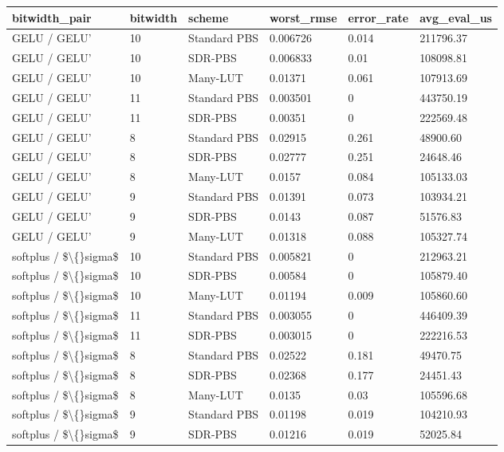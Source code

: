 \small
\setlength{\tabcolsep}{4pt}
\begin{tabular}{llllll}
\toprule
bitwidth\_pair & bitwidth & scheme & worst\_rmse & error\_rate & avg\_eval\_us \\
\midrule
GELU / GELU' & 10 & Standard PBS & 0.006726 & 0.014 & 211796.37 \\
GELU / GELU' & 10 & SDR-PBS & 0.006833 & 0.01 & 108098.81 \\
GELU / GELU' & 10 & Many-LUT & 0.01371 & 0.061 & 107913.69 \\
GELU / GELU' & 11 & Standard PBS & 0.003501 & 0 & 443750.19 \\
GELU / GELU' & 11 & SDR-PBS & 0.00351 & 0 & 222569.48 \\
GELU / GELU' & 8 & Standard PBS & 0.02915 & 0.261 & 48900.60 \\
GELU / GELU' & 8 & SDR-PBS & 0.02777 & 0.251 & 24648.46 \\
GELU / GELU' & 8 & Many-LUT & 0.0157 & 0.084 & 105133.03 \\
GELU / GELU' & 9 & Standard PBS & 0.01391 & 0.073 & 103934.21 \\
GELU / GELU' & 9 & SDR-PBS & 0.0143 & 0.087 & 51576.83 \\
GELU / GELU' & 9 & Many-LUT & 0.01318 & 0.088 & 105327.74 \\
softplus / \$\textbackslash\{\}sigma\$ & 10 & Standard PBS & 0.005821 & 0 & 212963.21 \\
softplus / \$\textbackslash\{\}sigma\$ & 10 & SDR-PBS & 0.00584 & 0 & 105879.40 \\
softplus / \$\textbackslash\{\}sigma\$ & 10 & Many-LUT & 0.01194 & 0.009 & 105860.60 \\
softplus / \$\textbackslash\{\}sigma\$ & 11 & Standard PBS & 0.003055 & 0 & 446409.39 \\
softplus / \$\textbackslash\{\}sigma\$ & 11 & SDR-PBS & 0.003015 & 0 & 222216.53 \\
softplus / \$\textbackslash\{\}sigma\$ & 8 & Standard PBS & 0.02522 & 0.181 & 49470.75 \\
softplus / \$\textbackslash\{\}sigma\$ & 8 & SDR-PBS & 0.02368 & 0.177 & 24451.43 \\
softplus / \$\textbackslash\{\}sigma\$ & 8 & Many-LUT & 0.0135 & 0.03 & 105596.68 \\
softplus / \$\textbackslash\{\}sigma\$ & 9 & Standard PBS & 0.01198 & 0.019 & 104210.93 \\
softplus / \$\textbackslash\{\}sigma\$ & 9 & SDR-PBS & 0.01216 & 0.019 & 52025.84 \\

\end{tabular}
